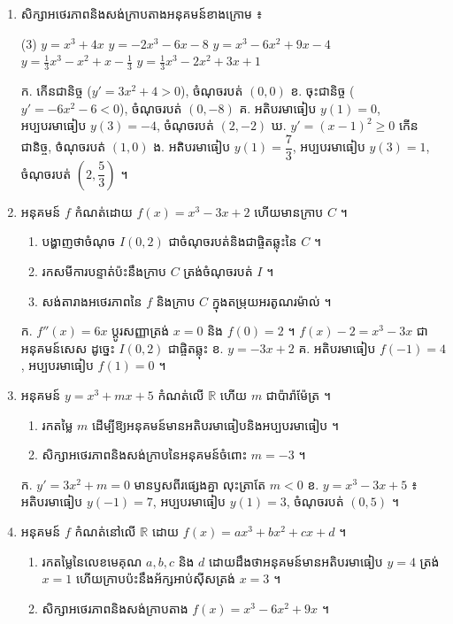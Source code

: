 \begin{enumerate}[1]
  \item សិក្សាអថេរភាពនិងសង់ក្រាបតាងអនុគមន៍ខាងក្រោម ៖
  \begin{tasks}(3)
    \task $y = x^3 + 4x$
    \task $y = -2x^3 - 6x - 8$
    \task $y = x^3 - 6x^2 + 9x - 4$
    \task $y = \frac{1}{3}x^3 - x^2 + x - \frac{1}{3}$
    \task $y = \frac{1}{3}x^3 - 2x^2 + 3x + 1$
  \end{tasks}
  \ans
  ក. កើនជានិច្ច ($y' = 3x^2 + 4 > 0$), ចំណុចរបត់ $(0, 0)$ \quad ខ. ចុះជានិច្ច ($y' = -6x^2 - 6 < 0$), ចំណុចរបត់ $(0, -8)$ \quad គ. អតិបរមាធៀប $y(1) = 0$, អប្បបរមាធៀប $y(3) = -4$, ចំណុចរបត់ $(2, -2)$ \quad ឃ. $y' = (x - 1)^2 \ge 0$ កើនជានិច្ច, ចំណុចរបត់ $(1, 0)$ \quad ង. អតិបរមាធៀប $y(1) = \dfrac{7}{3}$, អប្បបរមាធៀប $y(3) = 1$, ចំណុចរបត់ $\left(2, \dfrac{5}{3}\right)$ ។
  \item អនុគមន៍ $f$ កំណត់ដោយ $f(x) = x^3 - 3x + 2$ ហើយមានក្រាប $C$ ។
  \begin{enumerate}[a]
    \item បង្ហាញថាចំណុច $I(0, 2)$ ជាចំណុចរបត់និងជាផ្ចិតឆ្លុះនៃ $C$ ។
    \item រកសមីការបន្ទាត់ប៉ះនឹងក្រាប $C$ ត្រង់ចំណុចរបត់ $I$ ។
    \item សង់តារាងអថេរភាពនៃ $f$ និងក្រាប $C$ ក្នុងតម្រុយអរតូណរម៉ាល់ ។
  \end{enumerate}
  \ans
  ក. $f''(x) = 6x$ ប្ដូរសញ្ញាត្រង់ $x = 0$ និង $f(0) = 2$ ។ $f(x) - 2 = x^3 - 3x$ ជាអនុគមន៍សេស ដូច្នេះ $I(0, 2)$ ជាផ្ចិតឆ្លុះ \quad ខ. $y = -3x + 2$ \quad គ. អតិបរមាធៀប $f(-1) = 4$, អប្បបរមាធៀប $f(1) = 0$ ។
  \item អនុគមន៍ $y = x^3 + mx + 5$ កំណត់លើ $\mathbb{R}$ ហើយ $m$ ជាប៉ារ៉ាម៉ែត្រ ។
  \begin{enumerate}[a]
    \item រកតម្លៃ $m$ ដើម្បីឱ្យអនុគមន៍មានអតិបរមាធៀបនិងអប្បបរមាធៀប ។
    \item សិក្សាអថេរភាពនិងសង់ក្រាបនៃអនុគមន៍ចំពោះ $m = -3$ ។
  \end{enumerate}
  \ans
  ក. $y' = 3x^2 + m = 0$ មានឫសពីរផ្សេងគ្នា លុះត្រាតែ $m < 0$ \quad ខ. $y = x^3 - 3x + 5$ ៖ អតិបរមាធៀប $y(-1) = 7$, អប្បបរមាធៀប $y(1) = 3$, ចំណុចរបត់ $(0, 5)$ ។
  \item អនុគមន៍ $f$ កំណត់នៅលើ $\mathbb{R}$ ដោយ $f(x) = ax^3 + bx^2 + cx + d$ ។
  \begin{enumerate}[a]
    \item រកតម្លៃនៃលេខមេគុណ $a, b, c$ និង $d$ ដោយដឹងថាអនុគមន៍មានអតិបរមាធៀប $y = 4$ ត្រង់ $x = 1$ ហើយក្រាបប៉ះនឹងអ័ក្សអាប់ស៊ីសត្រង់ $x = 3$ ។
    \item សិក្សាអថេរភាពនិងសង់ក្រាបតាង $f(x) = x^3 - 6x^2 + 9x$ ។

\end{enumerate}
\end{enumerate}
